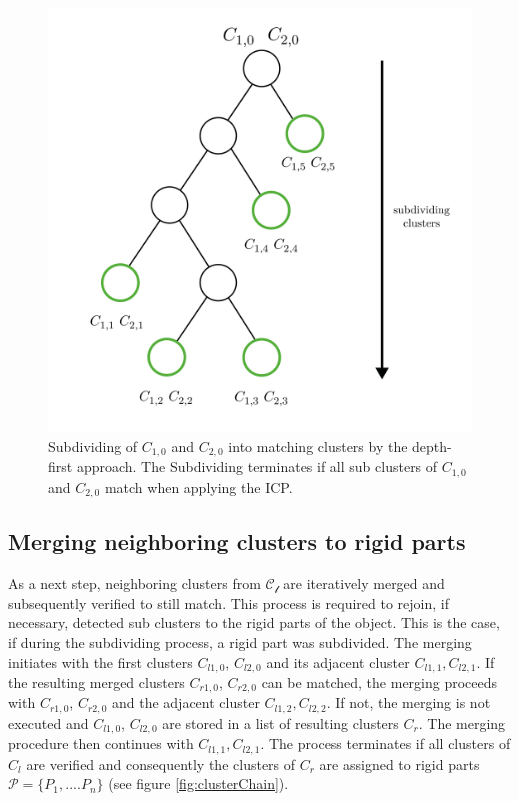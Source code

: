 \documentclass[notitlepage,english]{hgbreport}
\begin{document}
	\begin{figure}
		\centering
		\includegraphics[width=0.7\linewidth]{IllustrationTree}
		\caption{Subdividing of $C_{1,0}$ and $C_{2,0}$ into matching clusters by the depth-first approach. The Subdividing terminates if all sub clusters of $C_{1,0}$ and $C_{2,0}$ match when applying the ICP.}
		\label{fig:illustrationTree}
	\end{figure}
	
	\subsection{Merging neighboring clusters to rigid parts}
	
	As a next step, neighboring clusters from $\mathcal{C_l}$ are iteratively merged and subsequently verified to still match. This process is required to rejoin, if necessary, detected sub clusters to the rigid parts of the object. This is the case, if during the subdividing process, a rigid part was subdivided. The merging initiates with the first clusters $C_{l1,0}$, $C_{l2,0}$ and its adjacent cluster $C_{l1,1},C_{l2,1}$. If the resulting merged clusters $C_{r1,0}$, $C_{r2,0}$ can be matched, the merging proceeds with $C_{r1,0}$, $C_{r2,0}$ and the adjacent cluster $C_{l1,2},C_{l2,2}$. If not, the merging is not executed and $C_{l1,0}$, $C_{l2,0}$ are stored in a list of resulting clusters $C_r$. The merging procedure then continues with $C_{l1,1},C_{l2,1}$. The process terminates if all clusters of $C_l$ are verified and consequently the clusters of $C_r$ are assigned to rigid parts $ \mathcal{P} =  \{P_1,....P_n\}$ (see figure \ref{fig:clusterChain}). 
	
\end{document}
